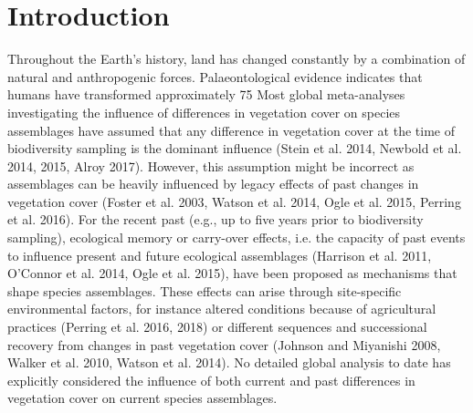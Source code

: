 \section{Introduction}
Throughout the Earth’s history, land has changed constantly by a combination of natural and anthropogenic forces. Palaeontological evidence indicates that humans have transformed approximately 75 %
Most global meta-analyses investigating the influence of differences in vegetation cover on species assemblages have assumed that any difference in vegetation cover at the time of biodiversity sampling is the dominant influence (Stein et al. 2014, Newbold et al. 2014, 2015, Alroy 2017). However, this assumption might be incorrect as assemblages can be heavily influenced by legacy effects of past changes in vegetation cover (Foster et al. 2003, Watson et al. 2014, Ogle et al. 2015, Perring et al. 2016). For the recent past (e.g., up to five years prior to biodiversity sampling), ecological memory or carry-over effects, i.e. the capacity of past events to influence present and future ecological assemblages (Harrison et al. 2011, O’Connor et al. 2014, Ogle et al. 2015), have been proposed as mechanisms that shape species assemblages. These effects can arise through site-specific environmental factors, for instance altered conditions because of agricultural practices (Perring et al. 2016, 2018) or different sequences and successional recovery from changes in past vegetation cover (Johnson and Miyanishi 2008, Walker et al. 2010, Watson et al. 2014). No detailed global analysis to date has explicitly considered the influence of both current and past differences in vegetation cover on current species assemblages.
